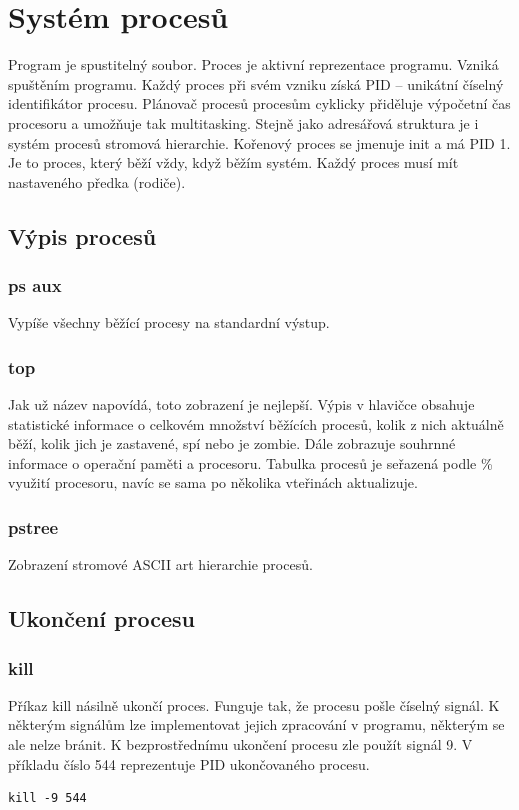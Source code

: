 \documentclass{article}
\begin{document}
\section{Systém procesů}
Program je spustitelný soubor. Proces je aktivní reprezentace programu. Vzniká spuštěním programu. Každý proces při svém vzniku získá PID -- unikátní číselný identifikátor procesu. Plánovač procesů procesům cyklicky přiděluje výpočetní čas procesoru a umožňuje tak multitasking. Stejně jako adresářová struktura je i systém procesů stromová hierarchie. Kořenový proces se jmenuje init a má PID 1. Je to proces, který běží vždy, když běžím systém. Každý proces musí mít nastaveného předka (rodiče).

\subsection{Výpis procesů}
\subsubsection{ps aux}
Vypíše všechny běžící procesy na standardní výstup. 
\subsubsection{top}
Jak už název napovídá, toto zobrazení je nejlepší. Výpis v hlavičce obsahuje statistické informace o celkovém množství běžících procesů, kolik z nich aktuálně běží, kolik jich je zastavené, spí nebo je zombie. Dále zobrazuje souhrnné informace o operační paměti a procesoru. Tabulka procesů je seřazená podle \% využití procesoru, navíc se sama po několika vteřinách aktualizuje.
\subsubsection{pstree}
Zobrazení stromové ASCII art hierarchie procesů.

\subsection{Ukončení procesu}
\subsubsection{kill}
Příkaz kill násilně ukončí proces. Funguje tak, že procesu pošle číselný signál. K některým signálům lze implementovat jejich zpracování v programu, některým se ale nelze bránit. K bezprostřednímu ukončení procesu zle použít signál 9. V příkladu číslo 544 reprezentuje PID ukončovaného procesu.
\begin{verbatim}
kill -9 544 
\end{verbatim}
\end{document}

